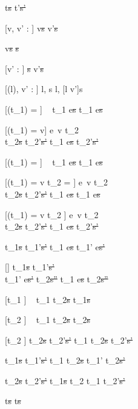   {t\st{s} \handle{\eta} t'\st{s'}}

[v, v' : \tau]
  { }
  {\Edit v\st{s}  \Edit v'\st{s}}

  { }
  {\Edit v\st{s} \handle{\Empty} \Fill\st{s}}

[v' : \tau]
  { }
  {\Fill \tau\st{s}  \Edit v'\st{s}}

[\Sigma(l), v' : \tau]
  { }
  {\Watch l, s  \Watch l, [l \mapsto v']s}

[\Value(t_1) = \nothing]
  {\ }
  {t_1 \Next e\st{s} \handle{\Continue} t_1 \Next e\st{s}}

[\Value(t_1) = v]
  {e\ v \downto t_2    \\
   t_2\st{s} \normalise t_2'\st{s'} }
  {t_1 \Next e\st{s} \handle{\Continue} t_2'\st{s'}}

[\Value(t_1) = \nothing]
  {\ }
  {t_1 \Then e\st{s} \handle{\Execute \pi} t_1 \Then e\st{s}}

[\Value(t_1) = v \land t_2 = \Fail]
  {e\ v \downto t_2    \\
   t_2\st{s} \handle{\Pick \pi} t_2'\st{s'} }
  {t_1 \Then e\st{s} \handle{\Execute \pi} t_1 \Then e\st{s}}

[\Value(t_1) = v \land t_2 \neq \Fail]
  {e\ v \downto t_2    \\
   t_2\st{s} \handle{\Pick \pi} t_2'\st{s'} }
  {t_1 \Then e\st{s} \handle{\Execute \pi} t_2'\st{s'}}

  {t_1\st{s} \handle{\eta} t_1'\st{s'}}
  {t_1 \Next e\st{s} \handle{\eta} t_1' \Next e\st{s'}}

[\eta \neq \Execute \pi]
  {t_1\st{s} \handle{\eta} t_1'\st{s'}       \\
   t_1' \Then e\st{s'} \normalise t_2\st{s''} }
  {t_1 \Then e\st{s} \handle{\eta} t_2\st{s''}}

[t_1 \neq \Fail]
  {\ }
  {t_1 \Or t_2\st{s} \handle{\Pick \First} t_1\st{s}}

[t_2 \neq \Fail]
  {\ }
  {t_1 \Or t_2\st{s} \handle{\Pick \Second} t_2\st{s}}

[t_2 \neq \Fail]
  {t_2\st{s} \handle{\Pick \pi} t_2'\st{s'}}
  {t_1 \Or t_2\st{s} \handle{\Pick \Other \pi} t_2'\st{s'}}


  {t_1\st{s} \handle{\eta} t_1'\st{s'} }
  {t_1 \AndOr t_2\st{s} \handle{\Left \eta} t_1' \AndOr t_2\st{s'}}

  {t_2\st{s} \handle{\eta} t_2'\st{s'} }
  {t_1\st{s} \AndOr t_2 \handle{\Right \eta} t_1 \AndOr t_2'\st{s'}}

  { }
  {t\st{s} \handle{\eta} t\st{s}}
